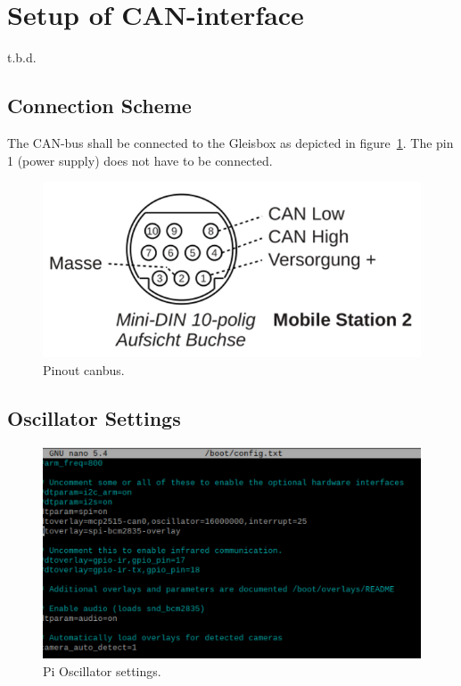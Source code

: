 \section{Setup of CAN-interface}
t.b.d.

\subsection{Connection Scheme}
The CAN-bus shall be connected to the Gleisbox as depicted in figure~\ref{fig:mobilestation2_din10}. The pin 1 (power supply) does not have to be connected.


\begin{figure}[h!]
	\centering
	\includegraphics[width=1.00\linewidth]{../figures/mobilestation2_din10.png}
	\caption{Pinout canbus.}
	\label{fig:mobilestation2_din10}
\end{figure}

\subsection{Oscillator Settings}



\begin{figure}[h!]
	\centering
	\includegraphics[width=1.00\linewidth]{../figures/oscillatorSettingsConfigTxt.png}
	\caption{Pi Oscillator settings.}
	\label{fig:oscillatorSettingsConfigTxt}
\end{figure}

